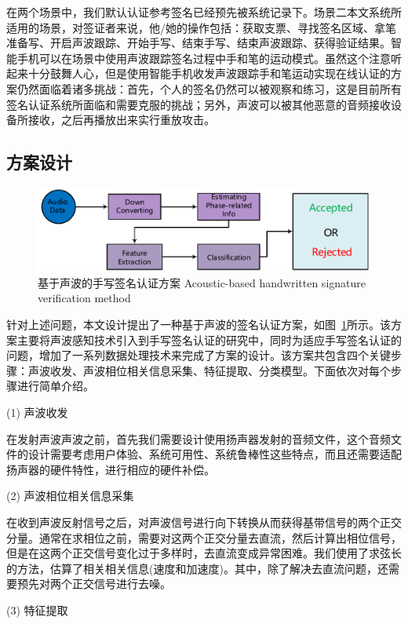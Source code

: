 在两个场景中，我们默认认证参考签名已经预先被系统记录下。场景二本文系统所适用的场景，对签证者来说，他/她的操作包括：获取支票、寻找签名区域、拿笔准备写、开启声波跟踪、开始手写、结束手写、结束声波跟踪、获得验证结果。智能手机可以在场景中使用声波跟踪签名过程中手和笔的运动模式。虽然这个注意听起来十分鼓舞人心，但是使用智能手机收发声波跟踪手和笔运动实现在线认证的方案仍然面临着诸多挑战：首先，个人的签名仍然可以被观察和练习，这是目前所有签名认证系统所面临和需要克服的挑战；另外，声波可以被其他恶意的音频接收设备所接收，之后再播放出来实行重放攻击。

\subsection{方案设计}
\begin{figure}[!htp]
  \centering
  \includegraphics[width=\textwidth]{figure/system-architecture.pdf}
  \bicaption
    {基于声波的手写签名认证方案}
    {Acoustic-based handwritten signature verification method}
  \label{fig:acoustic-hsv-method}
\end{figure}
针对上述问题，本文设计提出了一种基于声波的签名认证方案，如图~\ref{fig:acoustic-hsv-method}所示。该方案主要将声波感知技术引入到手写签名认证的研究中，同时为适应手写签名认证的问题，增加了一系列数据处理技术来完成了方案的设计。该方案共包含四个关键步骤：声波收发、声波相位相关信息采集、特征提取、分类模型。下面依次对每个步骤进行简单介绍。

(1) 声波收发

在发射声波声波之前，首先我们需要设计使用扬声器发射的音频文件，这个音频文件的设计需要考虑用户体验、系统可用性、系统鲁棒性这些特点，而且还需要适配扬声器的硬件特性，进行相应的硬件补偿。


(2) 声波相位相关信息采集

在收到声波反射信号之后，对声波信号进行向下转换从而获得基带信号的两个正交分量。通常在求相位之前，需要对这两个正交分量去直流，然后计算出相位信号，但是在这两个正交信号变化过于多样时，去直流变成异常困难。我们使用了求弦长的方法，估算了相关相关信息(速度和加速度)。其中，除了解决去直流问题，还需要预先对两个正交信号进行去噪。


(3) 特征提取

